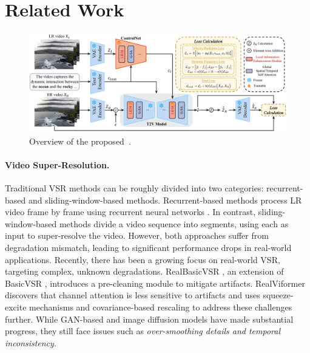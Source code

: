 \section{Related Work}
\label{sec:related work}

\begin{figure}[t]
    \centering
    \includegraphics[width=1\linewidth]{figure/overview.pdf}\vspace{-2mm}
    \caption{Overview of the proposed~\name.}
    \label{fig:overview}
\end{figure}

\paragraph{Video Super-Resolution.} 
Traditional VSR methods can be roughly divided into two categories: recurrent-based \cite{haris2019recurrent, huang2017video, liang2022recurrent, sajjadi2018frame, shi2022rethinking} and sliding-window-based \cite{caballero2017real,liang2024vrt,li2020mucan,xu2021temporal,yi2019progressive} methods. 
Recurrent-based methods process LR video frame by frame using recurrent neural networks \cite{mikolov2010recurrent}. In contrast, sliding-window-based methods divide a video sequence into segments, using each as input to super-resolve the video. 
However, both approaches suffer from degradation mismatch, leading to significant performance drops in real-world applications.
Recently, there has been a growing focus on real-world VSR, targeting complex, unknown degradations. RealBasicVSR \cite{chan2022investigating}, an extension of BasicVSR \cite{chan2021basicvsr}, introduces a pre-cleaning module to mitigate artifacts. 
RealViformer \cite{zhang2024realviformer} discovers that channel attention is less sensitive to artifacts and uses squeeze-excite mechanisms and covariance-based rescaling to address these challenges further. While GAN-based and image diffusion models have made substantial progress, they still face issues such as \textit{over-smoothing details and temporal inconsistency}.

